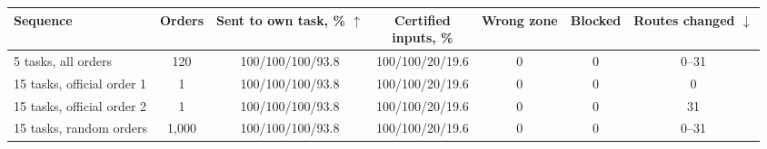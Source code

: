 \begin{tabular}{lcccccc}
    \toprule
    Sequence & Orders & \shortstack[c]{Sent to own\\task, \% $\uparrow$} & \shortstack[c]{Certified\\inputs, \%} & Wrong zone & Blocked & \shortstack[c]{Routes\\changed $\downarrow$} \\
    \midrule
    5 tasks, all orders & 120 & 100/100/100/93.8 & 100/100/20/19.6 & 0 & 0 & 0--31 \\
    \midrule
    15 tasks, official order 1 & 1 & 100/100/100/93.8 & 100/100/20/19.6 & 0 & 0 & 0 \\
    15 tasks, official order 2 & 1 & 100/100/100/93.8 & 100/100/20/19.6 & 0 & 0 & 31 \\
    15 tasks, random orders & 1,000 & 100/100/100/93.8 & 100/100/20/19.6 & 0 & 0 & 0--31 \\
    \bottomrule
\end{tabular}
